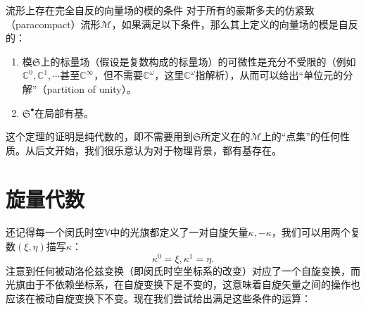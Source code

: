 \begin{them}[label={them:condition of existence of total reflective module}]{流形上存在完全自反的向量场的模的条件}
	对于所有的豪斯多夫的仿紧致\footnotemark（paracompact）流形$\mathcal{M}$，如果满足以下条件，那么其上定义的向量场的模是自反的：
	\begin{enumerate}[label=(\alph*)]
		\item 模$\mathfrak{S}$上的标量场（假设是复数构成的标量场）的可微性是充分不受限的（例如$\mathbb{C}^{0} ,\mathbb{C}^{1} ,\cdots $甚至$\mathbb{C}^{\infty }$，但不需要$\mathbb{C}^{\omega }$，这里$\mathbb{C}^{\omega }$指解析），从而可以给出“单位元的分解”（partition of unity）。
		\item $\mathfrak{S}^{\bullet }$在局部有基。
	\end{enumerate}
\end{them}

这个定理的证明是纯代数的，即不需要用到$\mathfrak{S}$所定义在的$\mathcal{M}$上的“点集”的任何性质。从后文开始，我们很乐意认为对于物理背景，都有基存在。


\section{旋量代数}

还记得每一个闵氏时空$\mathbb{V}$中的光旗都定义了一对自旋矢量$\kappa ,-\kappa $，我们可以用两个复数$( \xi ,\eta )$描写$\kappa $：
\begin{equation*}
	\kappa ^{0} =\xi ,\kappa ^{1} =\eta .
\end{equation*}
注意到任何被动洛伦兹变换（即闵氏时空坐标系的改变）对应了一个自旋变换，而光旗由于不依赖坐标系，在自旋变换下是不变的，这意味着自旋矢量之间的操作也应该在被动自旋变换下不变。现在我们尝试给出满足这些条件的运算：

